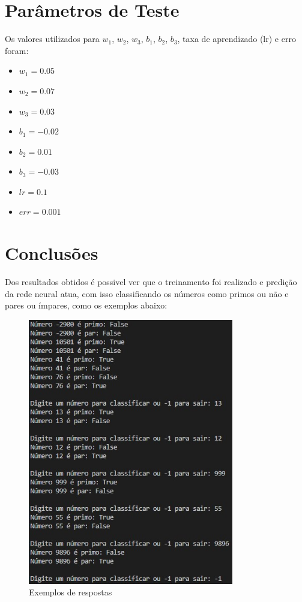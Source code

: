 \documentclass{article}
\begin{document}
\newpage

\section{Parâmetros de Teste}
\begin{flushleft}
Os valores utilizados para $w_1$, $w_2$, $w_3$, $b_1$, $b_2$, $b_3$, taxa de aprendizado (lr) e erro foram:
\end{flushleft}

\begin{itemize}
  \item $w_1 = 0.05$
  \item $w_2 = 0.07$
  \item $w_3 = 0.03$
  \item $b_1 = -0.02$
  \item $b_2 = 0.01$
  \item $b_3 = -0.03$
  \item $lr = 0.1$
  \item $err = 0.001$
\end{itemize}
\newpage
\section{Conclusões}

\begin{flushleft}
Dos resultados obtidos é possivel ver que o treinamento foi realizado e predição da rede neural atua, com isso classificando os números como primos ou não e pares ou ímpares, como os exemplos abaixo:
\end{flushleft}
\begin{figure}
    \centering
    \includegraphics[width=0.8\textwidth]{Exemplos_2.jpg}
    \caption{Exemplos de respostas}
    \label{fig:conclusões}
\end{figure}
\newpage
\end{document}

